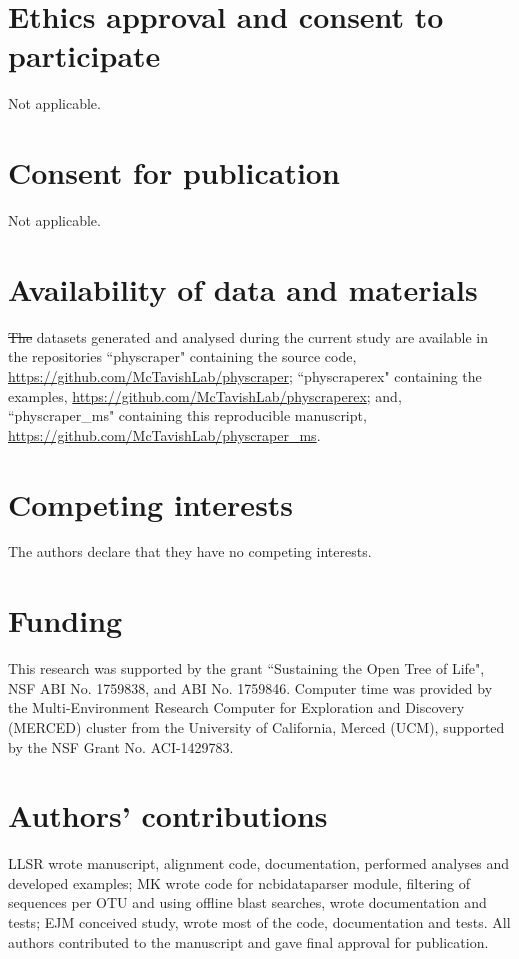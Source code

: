 \documentclass{bmcart}
\providecommand{\DIFaddtex}[1]{{\protect\color{blue}\uwave{#1}}} %
\providecommand{\DIFdeltex}[1]{{\protect\color{red}\sout{#1}}}                      %
\providecommand{\DIFaddbegin}{} %
\providecommand{\DIFaddend}{} %
\providecommand{\DIFdelbegin}{} %
\providecommand{\DIFdelend}{} %
\providecommand{\DIFadd}[1]{\texorpdfstring{\DIFaddtex{#1}}{#1}} %
\providecommand{\DIFdel}[1]{\texorpdfstring{\DIFdeltex{#1}}{}} %
\begin{document}
\begin{backmatter}

\section*{Ethics approval and consent to participate}
Not applicable.

\section*{Consent for publication}
Not applicable.

\section*{Availability of data and materials}

\DIFdelbegin \DIFdel{The }\DIFdelend \DIFaddbegin \DIFadd{Code and }\DIFaddend datasets generated and analysed during the current study are available in
the repositories ``physcraper" containing the source code,
\href{https://github.com/McTavishLab/physcraper}{https://github.com/McTavishLab/physcraper};
 ``physcraperex" containing the examples,
\href{https://github.com/McTavishLab/physcraperex}{https://github.com/McTavishLab/physcraperex};
and, ``physcraper\_ms" containing this reproducible manuscript,
\href{https://github.com/McTavishLab/physcraper\_ms}{https://github.com/McTavishLab/physcraper\_ms}.

\section*{Competing interests}
The authors declare that they have no competing interests.

\section*{Funding}
This research was supported by the grant ``Sustaining the Open Tree of Life", NSF ABI
No. 1759838, and ABI No. 1759846.
Computer time was provided by the Multi-Environment Research Computer for
Exploration and Discovery (MERCED) cluster from the University of California,
Merced (UCM), supported by the NSF Grant No. ACI-1429783.

\section*{Authors' contributions}
LLSR wrote manuscript, alignment code, documentation, performed analyses and developed examples; MK wrote code for ncbidataparser module, filtering of sequences per OTU and using offline blast searches, wrote documentation and tests; EJM conceived study, wrote most of the code, documentation and tests.
All authors contributed to the manuscript and gave final approval for publication.



\end{backmatter}
\end{document}
